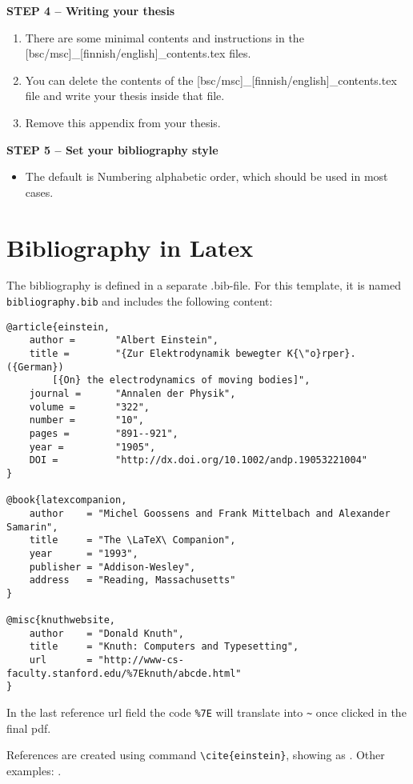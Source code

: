 {\textbf{STEP 4 -- Writing your thesis}}

\begin{enumerate}
\item There are some minimal contents and instructions in the [bsc/msc]\_[finnish/english]\_contents.tex files.
\item You can delete the contents of the [bsc/msc]\_[finnish/english]\_contents.tex file and write your thesis inside that file.
\item Remove this appendix from your thesis.
\end{enumerate}

{\textbf{STEP 5 -- Set your bibliography style}}

\begin{itemize}
\item The default is Numbering alphabetic order, which should be used in most cases.
\end{itemize}

\section{Bibliography in Latex}

The bibliography is defined in a separate .bib-file. For this template, it is named \texttt{bibliography.bib} and includes the following content:
\begin{verbatim}
@article{einstein,
    author =       "Albert Einstein",
    title =        "{Zur Elektrodynamik bewegter K{\"o}rper}. ({German})
        [{On} the electrodynamics of moving bodies]",
    journal =      "Annalen der Physik",
    volume =       "322",
    number =       "10",
    pages =        "891--921",
    year =         "1905",
    DOI =          "http://dx.doi.org/10.1002/andp.19053221004"
}
 
@book{latexcompanion,
    author    = "Michel Goossens and Frank Mittelbach and Alexander Samarin",
    title     = "The \LaTeX\ Companion",
    year      = "1993",
    publisher = "Addison-Wesley",
    address   = "Reading, Massachusetts"
}
 
@misc{knuthwebsite,
    author    = "Donald Knuth",
    title     = "Knuth: Computers and Typesetting",
    url       = "http://www-cs-faculty.stanford.edu/%7Eknuth/abcde.html"
}
\end{verbatim}

In the last reference url field the code \verb+%7E+ will translate into \verb+~+ once clicked in the final pdf.

References are created using command \texttt{\textbackslash cite\{einstein\}}, showing as \citep{einstein}. Other examples: \citep{latexcompanion,knuthwebsite}.


